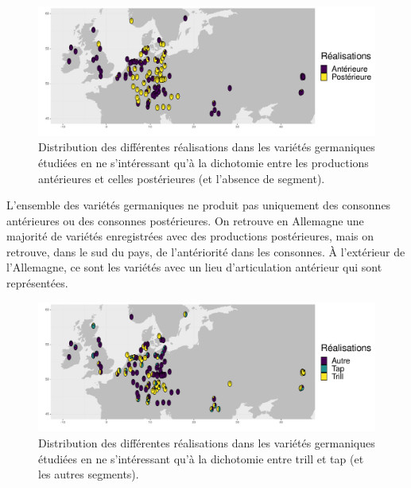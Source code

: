 \begin{figure}
	\centering
	\includegraphics[width=1\linewidth]{substance/images/productiongermanic_2_viridis}
	\caption[Distribution des différentes réalisations dans les variétés germaniques pour les productions antérieures et postérieures]{Distribution des différentes réalisations dans les variétés germaniques étudiées en ne s'intéressant qu'à la dichotomie entre les productions antérieures et celles postérieures (et l'absence de segment).}
	\label{fig:productiongermanic2viridis}
\end{figure}

L'ensemble des variétés germaniques ne produit pas uniquement des consonnes antérieures ou des consonnes postérieures. 
On retrouve en Allemagne une majorité de variétés enregistrées avec des productions postérieures, mais on retrouve, dans le sud du pays, de l'antériorité dans les consonnes. À l'extérieur de l'Allemagne, ce sont les variétés avec un lieu d'articulation antérieur qui sont représentées.\\

\begin{figure}
	\centering
	\includegraphics[width=1\linewidth]{substance/images/productiongermanic_3_viridis}
	\caption[Distribution des différentes réalisations dans les variétés germaniques pour le trill et le tap]{Distribution des différentes réalisations dans les variétés germaniques étudiées en ne s'intéressant qu'à la dichotomie entre trill et tap (et les autres segments).}
	\label{fig:productiongermanic3viridis}
\end{figure}

